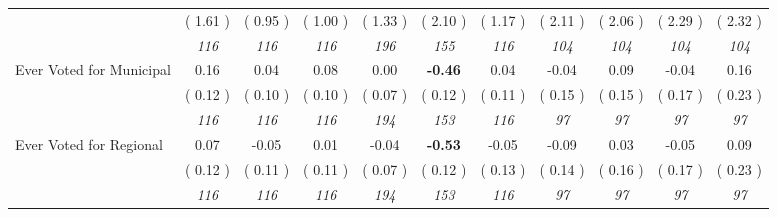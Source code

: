\begin{tabular}{l c c c c c c c c c c}
& (     1.61 ) & (     0.95 ) & (     1.00 ) & (     1.33 ) & (     2.10 ) & (     1.17 ) & (     2.11 ) & (     2.06 ) & (     2.29 ) & (     2.32 ) \\
& \textit{ 116 } & \textit{ 116 } & \textit{ 116 } & \textit{ 196 } & \textit{ 155 } & \textit{ 116 } & \textit{ 104 } & \textit{ 104 } & \textit{ 104 } & \textit{ 104 } \\
Ever Voted for Municipal &      0.16 &      0.04 &      0.08 &      0.00 & \textbf{     -0.46 } &      0.04 &     -0.04 &      0.09 &     -0.04 &      0.16 \\
& (     0.12 ) & (     0.10 ) & (     0.10 ) & (     0.07 ) & (     0.12 ) & (     0.11 ) & (     0.15 ) & (     0.15 ) & (     0.17 ) & (     0.23 ) \\
& \textit{ 116 } & \textit{ 116 } & \textit{ 116 } & \textit{ 194 } & \textit{ 153 } & \textit{ 116 } & \textit{ 97 } & \textit{ 97 } & \textit{ 97 } & \textit{ 97 } \\
Ever Voted for Regional &      0.07 &     -0.05 &      0.01 &     -0.04 & \textbf{     -0.53 } &     -0.05 &     -0.09 &      0.03 &     -0.05 &      0.09 \\
& (     0.12 ) & (     0.11 ) & (     0.11 ) & (     0.07 ) & (     0.12 ) & (     0.13 ) & (     0.14 ) & (     0.16 ) & (     0.17 ) & (     0.23 ) \\
& \textit{ 116 } & \textit{ 116 } & \textit{ 116 } & \textit{ 194 } & \textit{ 153 } & \textit{ 116 } & \textit{ 97 } & \textit{ 97 } & \textit{ 97 } & \textit{ 97 } \\
\bottomrule
\end{tabular}
